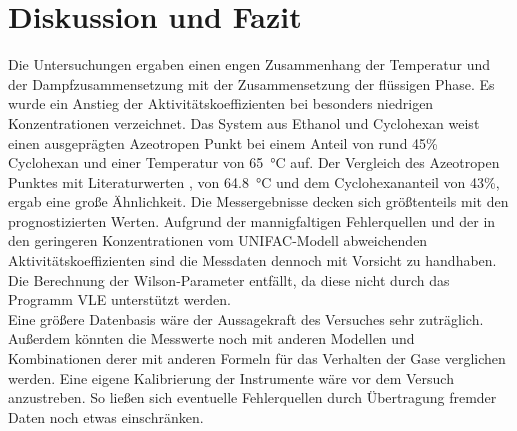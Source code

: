 \section{Diskussion und Fazit}
\label{sec:diskussion}
Die Untersuchungen ergaben einen engen Zusammenhang der Temperatur und der Dampfzusammensetzung mit der Zusammensetzung der flüssigen Phase. Es wurde ein Anstieg der Aktivitätskoeffizienten bei besonders niedrigen Konzentrationen verzeichnet. Das System aus Ethanol und Cyclohexan weist einen ausgeprägten Azeotropen Punkt bei einem Anteil von rund 45\% Cyclohexan und einer Temperatur von \SI{65}{\degreeCelsius} auf. Der Vergleich des Azeotropen Punktes mit Literaturwerten \cite{azeotrop1}\cite{azeotrop2}, von \SI{64,8}{\degreeCelsius} und dem Cyclohexananteil von 43\%, ergab eine große Ähnlichkeit. Die Messergebnisse decken sich größtenteils mit den prognostizierten Werten. Aufgrund der mannigfaltigen Fehlerquellen und der in den geringeren Konzentrationen vom  UNIFAC-Modell abweichenden Aktivitätskoeffizienten sind die Messdaten dennoch mit Vorsicht zu handhaben. Die Berechnung der Wilson-Parameter entfällt, da diese nicht durch das Programm VLE unterstützt werden. \\
Eine größere Datenbasis wäre der Aussagekraft des Versuches sehr zuträglich. Außerdem könnten die Messwerte noch mit anderen Modellen und Kombinationen derer mit anderen Formeln für das Verhalten der Gase verglichen werden. Eine eigene Kalibrierung der Instrumente wäre vor dem Versuch anzustreben. So ließen sich eventuelle Fehlerquellen durch Übertragung fremder Daten noch etwas einschränken. 

